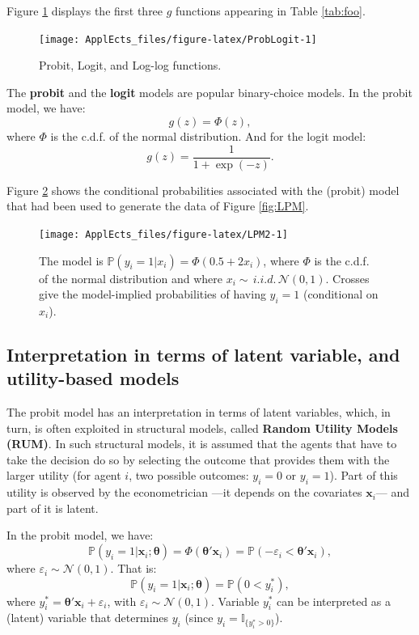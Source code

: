 \documentclass[
  12pt,
]{book}
\theoremstyle{definition}
\theoremstyle{definition}
\theoremstyle{definition}
\theoremstyle{definition}
\theoremstyle{remark}
\begin{document}
Figure \ref{fig:ProbLogit} displays the first three \(g\) functions appearing in Table \ref{tab:foo}.

\begin{figure}
\texttt{[image: ApplEcts\_files/figure-latex/ProbLogit-1]} \caption{Probit, Logit, and Log-log functions.}\label{fig:ProbLogit}
\end{figure}

The \textbf{probit} and the \textbf{logit} models are popular binary-choice models. In the probit model, we have:
\begin{equation}
g(z) = \Phi(z),\label{eq:probit}
\end{equation}
where \(\Phi\) is the c.d.f. of the normal distribution. And for the logit model:
\begin{equation}
g(z) = \frac{1}{1+\exp(-z)}.\label{eq:logit}
\end{equation}

Figure \ref{fig:LPM2} shows the conditional probabilities associated with the (probit) model that had been used to generate the data of Figure \ref{fig:LPM}.

\begin{figure}
\texttt{[image: ApplEcts\_files/figure-latex/LPM2-1]} \caption{The model is $\mathbb{P}(y_i=1|x_i)=\Phi(0.5+2x_i)$, where $\Phi$ is the c.d.f. of the normal distribution and where $x_i \sim \,i.i.d.\,\mathcal{N}(0,1)$. Crosses give the model-implied probabilities of having $y_i=1$ (conditional on $x_i$).}\label{fig:LPM2}
\end{figure}

\hypertarget{latent}{%
\subsection{Interpretation in terms of latent variable, and utility-based models}\label{latent}}

The probit model has an interpretation in terms of latent variables, which, in turn, is often exploited in structural models, called \textbf{Random Utility Models (RUM)}. In such structural models, it is assumed that the agents that have to take the decision do so by selecting the outcome that provides them with the larger utility (for agent \(i\), two possible outcomes: \(y_i=0\) or \(y_i=1\)). Part of this utility is observed by the econometrician ---it depends on the covariates \(\mathbf{x}_i\)--- and part of it is latent.

In the probit model, we have:
\[
\mathbb{P}(y_i=1|\mathbf{x}_i;\boldsymbol\theta) = \Phi(\boldsymbol\theta'\mathbf{x}_i) = \mathbb{P}(-\varepsilon_{i}<\boldsymbol\theta'\mathbf{x}_i),
\]
where \(\varepsilon_{i} \sim \mathcal{N}(0,1)\). That is:
\[
\mathbb{P}(y_i=1|\mathbf{x}_i;\boldsymbol\theta) = \mathbb{P}(0< y_i^*),
\]
where \(y_i^* = \boldsymbol\theta'\mathbf{x}_i + \varepsilon_i\), with \(\varepsilon_{i} \sim \mathcal{N}(0,1)\). Variable \(y_i^*\) can be interpreted as a (latent) variable that determines \(y_i\) (since \(y_i = \mathbb{I}_{\{y_i^*>0\}}\)).
\end{document}
